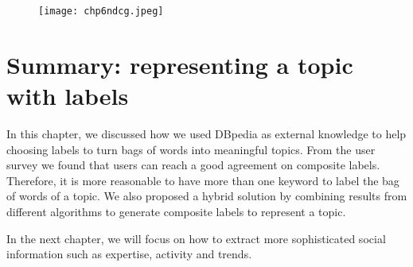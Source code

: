 \begin{figure}[htp]
\centering
\texttt{[image: chp6ndcg.jpeg]}  
\caption{}
\label{fig:chp6ndcg} 
\end{figure}




\section{Summary: representing a topic with labels}
In this chapter, we discussed how we used DBpedia as external knowledge to help choosing labels to turn bags of words into meaningful topics. From the user survey we found that users can reach a good agreement on composite labels. Therefore, it is more reasonable to have more than one keyword to label the bag of words of a topic. We also proposed a hybrid solution by combining results from different algorithms to generate composite labels to represent a topic. 

In the next chapter, we will focus on how to extract more sophisticated social information such as expertise, activity and trends.
